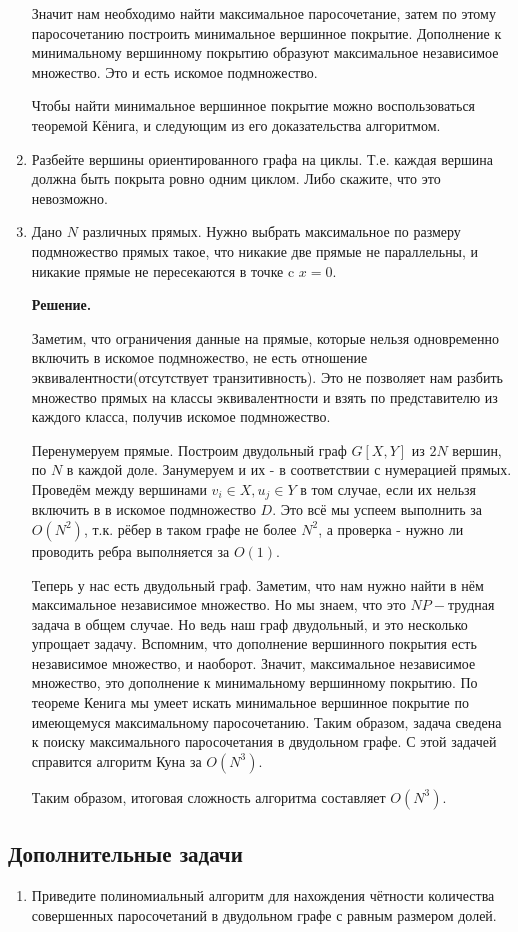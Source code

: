 \begin{enumerate}
	Значит нам необходимо найти максимальное паросочетание, затем по этому паросочетанию построить 
	минимальное вершинное покрытие. Дополнение к минимальному вершинному покрытию образуют максимальное 
	независимое множество. Это и есть искомое подмножество.
	
	Чтобы найти минимальное вершинное покрытие можно воспользоваться теоремой Кёнига, и следующим из его 
	доказательства алгоритмом.
	
	\item Разбейте вершины ориентированного графа на циклы. Т.е. каждая вершина должна быть покрыта ровно одним 
	циклом. Либо скажите, что это невозможно.
	\item Дано $N$ различных прямых. Нужно выбрать максимальное по размеру подмножество прямых такое, что никакие 
	две прямые не параллельны, и никакие прямые не пересекаются в точке c $x = 0$.
	
	\textbf{Решение.}
	
	Заметим, что ограничения данные на прямые, которые нельзя одновременно включить в искомое подмножество, не 
	есть отношение эквивалентности(отсутствует транзитивность). Это не позволяет нам разбить множество прямых 
	на классы эквивалентности и взять по представителю из каждого класса, получив искомое подмножество. 
	
	Перенумеруем прямые. Построим двудольный граф $G[X,Y]$ из $2N$ вершин, по $N$ в каждой доле. Занумеруем и 
	их - в соответствии с нумерацией прямых. Проведём между вершинами $v_{i} \in X, u_j \in Y$ в том случае, 
	если их нельзя включить в в искомое подмножество $D$. Это всё мы успеем выполнить за $O(N ^ 2)$, т.к. рёбер 
	в таком графе не более $N^2$, а проверка - нужно ли проводить ребра выполняется за $O(1)$. 
	
	Теперь у нас есть двудольный граф. Заметим, что нам нужно найти в нём максимальное независимое множество. 
	Но мы знаем, что это $NP-$трудная задача в общем случае. Но ведь наш граф двудольный, и это несколько 
	упрощает задачу. Вспомним, что дополнение вершинного покрытия есть независимое множество, и наоборот. 
	Значит, максимальное независимое множество, это дополнение к минимальному вершинному покрытию. По теореме 
	Кенига мы умеет искать минимальное вершинное покрытие по имеющемуся максимальному паросочетанию. Таким 
	образом, задача сведена к поиску максимального паросочетания в двудольном графе. С этой задачей справится 
	алгоритм Куна за $O(N^3)$.
	
	Таким образом, итоговая сложность алгоритма составляет $O(N^3)$.
	 
\end{enumerate}

\subsection*{Дополнительные задачи}
\begin{enumerate}
	\item Приведите полиномиальный алгоритм для нахождения чётности количества совершенных паросочетаний в 
	двудольном графе с равным размером долей.
\end{enumerate}